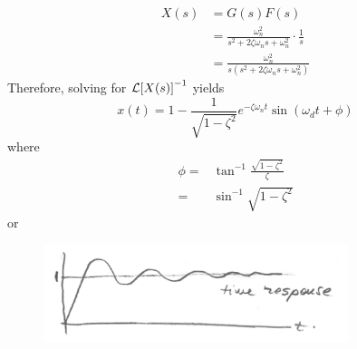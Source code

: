 \documentclass[12pt,letter]{article}
\begin{document}
\begin{align}
X(s) &= G(s)F(s) \\
&= \frac{\omega_n^2}{s^2 + 2 \zeta \omega_n s + \omega_n^2} \cdot \frac{1}{s} \nonumber \\
&=  \frac{\omega_n^2}{s(s^2 + 2 \zeta \omega_n s + \omega_n^2)}
\end{align}
Therefore, solving for $\mathcal{L}{\left[X(s)\right]}^{-1}$ yields
\begin{equation}
x(t) = 1 - \frac{1}{\sqrt{1-\zeta^2}}e^{-\zeta \omega_n t} \sin(\omega_dt+\phi)
\end{equation}
where
\begin{align}
\phi =& \tan^{-1}\frac{\sqrt{1-\zeta^2}}{\zeta} \\
=& \sin^{-1}\sqrt{1-\zeta^2}  \nonumber
\end{align}
or
\begin{figure}[H]
	\centering
	\includegraphics[width=3.5in]{../figures/x_t_time_response_2nd_order_step}
\end{figure}
\end{document}
